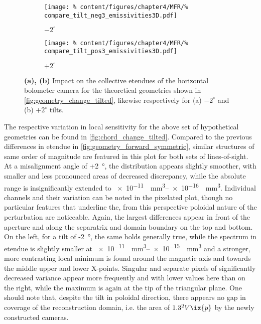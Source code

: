 %
            \begin{figure}[t]%
                \centering%
                \begin{subfigure}{0.47\textwidth}%
                    \texttt{[image: \%
                        content/figures/chapter4/MFR/\%
                        compare\_tilt\_neg3\_emissivities3D.pdf]}%
                    \caption{$-2^{\circ}$}%
                \end{subfigure}%
                \hfill%
                \begin{subfigure}{0.47\textwidth}%
                    \texttt{[image: \%
                        content/figures/chapter4/MFR/\%
                        compare\_tilt\_pos3\_emissivities3D.pdf]}%
                    \caption{$+2^{\circ}$}%
                \end{subfigure}%
                \caption{\textbf{(a), (b)} Impact on the collective etendues of the horizontal bolometer camera for the theoretical geometries shown in \cref{fig:geometry_change_tilted}, likewise respectively for (a) $-2^{\circ}$ and (b) $+2^{\circ}$ tilts.}\label{fig:emiss_change_tilted}%
            \end{figure}%
%
            The respective variation in local sensitivity for the above set of hypothetical geometries can be found in \cref{fig:chord_change_tilted}. Compared to the previous differences in etendue in \cref{fig:geometry_forward_symmetric}, similar structures of same order of magnitude are featured in this plot for both sets of lines-of-sight. At a misalignment angle of +\SI{2}{\degree}, the distribution appears slightly smoother, with smaller and less pronounced areas of decreased discrepancy, while the absolute range is insignificantly extended to \SIrange[per-mode=reciprocal]{e-11}{e-16}{\per\cubic\milli\meter}. Individual channels and their variation can be noted in the pixelated plot, though no particular features that underline the, from this perspective poloidal nature of the perturbation are noticeable. Again, the largest differences appear in front of the aperture and along the separatrix and domain boundary on the top and bottom. On the left, for a tilt of -\SI{2}{\degree}, the same holds generally true, while the spectrum in etendue is slightly smaller at \SIrange[per-mode=reciprocal]{e-11}{e-15}{\per\cubic\milli\meter} and a stronger, more contrasting local minimum is found around the magnetic axis and towards the middle upper and lower X-points. Singular and separate pixels of significantly decreased variance appear more frequently and with lower values here than on the right, while the maximum is again at the tip of the triangular plane. One should note that, despite the tilt in poloidal direction, there appears no gap in coverage of the reconstruction domain, i.e. the area of $1.3^{2}V\ix{p}$ by the newly constructed cameras.\\%
